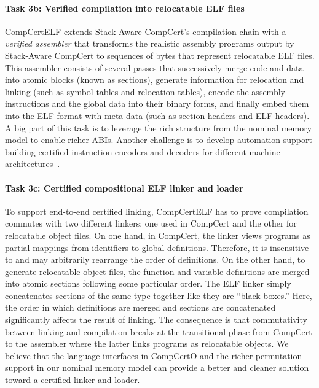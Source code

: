 \vspace*{-2ex}
\paragraph*{Task 3b: Verified compilation into relocatable ELF files}
CompCertELF %
extends Stack-Aware CompCert's compilation chain with a
\emph{verified assembler} that transforms the realistic assembly
programs output by Stack-Aware CompCert to sequences of bytes that
represent relocatable ELF files.  This assembler consists of several
passes that successively merge code and data into atomic blocks (known
as sections), generate information for relocation and linking (such as
symbol tables and relocation tables), encode the assembly instructions
and the global data into their binary forms, and finally embed them
into the ELF format with meta-data (such as section headers and ELF
headers). A big part of this task is to leverage the rich structure
from the nominal memory model to enable richer ABIs.  Another
challenge is to develop automation support building certified
instruction encoders and decoders for different machine
architectures~\cite{xu21}.

\vspace*{-2ex}
\paragraph*{Task 3c: Certified compositional ELF linker and loader}
To support end-to-end certified linking, CompCertELF has to prove
compilation commutes with two different linkers: one used in CompCert
and the other for relocatable object files. On one hand, in CompCert,
the linker views programs as partial mappings from identifiers to
global definitions. Therefore, it is insensitive to and may
arbitrarily rearrange the order of definitions. On the other hand, to
generate relocatable object files, the function and variable
definitions are merged into atomic sections following some particular
order. The ELF linker simply concatenates sections of the same type
together like they are ``black boxes.''  Here, the order in which
definitions are merged and sections are concatenated significantly
affects the result of linking.  The consequence is that commutativity
between linking and compilation breaks at the transitional phase from
CompCert to the assembler where the latter links programs as
relocatable objects. We believe that the language interfaces in
CompCertO and the richer permutation support in our nominal memory
model can provide a better and cleaner solution toward a certified
linker and loader.


